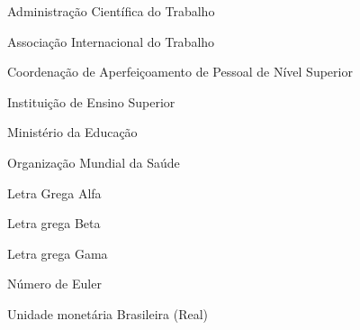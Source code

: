 \documentclass[
  12pt,		%
  a4paper,	%
  openright,  %
  oneside,	%
  chapter=TITLE,		%
  section=TITLE,		%
  english,	%
  french,	    %
  spanish,	%
  brazil	    %
]{abntex2}
\begin{document}
   
    
    \begin{siglas}
        \item [ACT]	Administração Científica do Trabalho 
        \item [AIT]	Associação Internacional do Trabalho 
        \item [CAPES]	Coordenação de Aperfeiçoamento de Pessoal de Nível Superior 
        \item [IES]	Instituição de Ensino Superior 
        \item [MEC]	Ministério da Educação 
        \item [OMS]	Organização Mundial da Saúde
    \end{siglas}  

    
    
    
    \begin{simbolos}
        \item[$\alpha$] Letra Grega Alfa
        \item[$\beta$] Letra grega Beta
        \item[$\gamma$] Letra grega Gama
        \item[$e$] Número de Euler
        \item[R\$] Unidade monetária Brasileira (Real)
    \end{simbolos}
    
    
\end{document}
